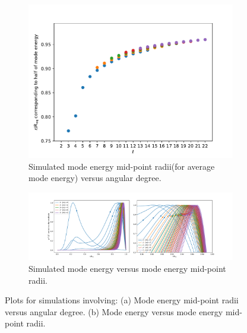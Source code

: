 \documentclass{article}
\begin{document}
\begin{figure}
    \centering
    \begin{subfigure}{0.6\linewidth}
        \centering
        \includegraphics[width=\linewidth]{mode_energy_midpoint_radii.pdf}
        \caption{Simulated mode energy mid-point radii(for average mode energy) versus angular degree.}
        \label{fig:sub1}
    \end{subfigure}
    \hspace{-5.5cm} %
    \begin{subfigure}{1.14\linewidth}
        \centering
        \includegraphics[width=\linewidth]{mode_energy_integrands (2).pdf}
        \caption{Simulated mode energy versus mode energy mid-point radii.}
        \label{fig:sub2}
    \end{subfigure}
    \caption{Plots for simulations involving: (a) Mode energy mid-point radii versus angular degree.  (b) Mode energy versus mode energy mid-point radii.}
    \label{fig:overall}
\end{figure}

\end{document}
